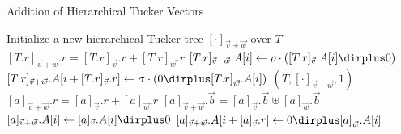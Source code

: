 \begin{algorithm}
  \caption{Addition of Hierarchical Tucker Vectors}
  \begin{algorithmic}[1]
    \State Initialize a new hierarchical Tucker tree $[\cdot]_{\vec{v}
      + \vec{w}}$ over $T$
    \State $[T.r]_{\vec{v} + \vec{w}}.r = [T.r]_{\vec{v}}.r +
    [T.r]_{\vec{w}}.r$
    \State {}
    \State {}
    \State $[T.r]_{\vec{v} + \vec{w}}.A[i] \gets \rho \cdot ([T.r]_{\vec{v}}.A[i]
    \dirplus 0)$
    \EndFor
    \State $[T.r]_{\vec{v} + \vec{w}}.A[i + [T.r]_{\vec{v}}.r] \gets
    \sigma \cdot (0 \dirplus [T.r]_{\vec{w}}.A[i])$
    \EndFor
    \State \Return $(T, [\cdot]_{\vec{v} + \vec{w}}, 1)$
    \EndFunction
    \Statex
    \State $[a]_{\vec{v} + \vec{w}}.r = [a]_{\vec{v}}.r +
    [a]_{\vec{w}}.r$
    \State $[a]_{\vec{v} + \vec{w}}.\vec{b} = [a]_{\vec{v}}.\vec{b}
    \uplus [a]_{\vec{w}}.\vec{b}$
    \Else
    \State {}
    \State {}
    \EndIf
    \State $[a]_{\vec{v} + \vec{w}}.A[i] \gets [a]_{\vec{v}}.A[i]
    \dirplus 0$
    \EndFor
    \State $[a]_{\vec{v} + \vec{w}}.A[i + [a]_{\vec{v}}.r] \gets
    0 \dirplus [a]_{\vec{w}}.A[i]$
    \EndFor
    \EndProcedure
  \end{algorithmic}
\end{algorithm}